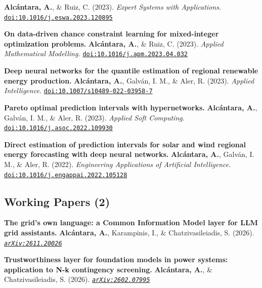 \documentclass[10pt,a4paper]{article}
\begin{document}
\begin{enumerate}[label={[\arabic*]}, series=publist, leftmargin=2.1em,
                  itemsep=5pt, topsep=3pt, parsep=0pt]
      \textbf{Alc\'antara, A.}, \& Ruiz, C. (2023). \textit{Expert Systems with Applications.} \href{https://doi.org/10.1016/j.eswa.2023.120895}{\nolinkurl{doi:10.1016/j.eswa.2023.120895}}\item \textbf{On data-driven chance constraint learning for mixed-integer optimization problems.}\newline
      \textbf{Alc\'antara, A.}, \& Ruiz, C. (2023). \textit{Applied Mathematical Modelling.} \href{https://doi.org/10.1016/j.apm.2023.04.032}{\nolinkurl{doi:10.1016/j.apm.2023.04.032}}\item \textbf{Deep neural networks for the quantile estimation of regional renewable energy production.}\newline
      \textbf{Alc\'antara, A.}, Galv\'an, I. M., \& Aler, R. (2023). \textit{Applied Intelligence.} \href{https://doi.org/10.1007/s10489-022-03958-7}{\nolinkurl{doi:10.1007/s10489-022-03958-7}}\item \textbf{Pareto optimal prediction intervals with hypernetworks.}\newline
      \textbf{Alc\'antara, A.}, Galv\'an, I. M., \& Aler, R. (2023). \textit{Applied Soft Computing.} \href{https://doi.org/10.1016/j.asoc.2022.109930}{\nolinkurl{doi:10.1016/j.asoc.2022.109930}}\item \textbf{Direct estimation of prediction intervals for solar and wind regional energy forecasting with deep neural networks.}\newline
      \textbf{Alc\'antara, A.}, Galv\'an, I. M., \& Aler, R. (2022). \textit{Engineering Applications of Artificial Intelligence.} \href{https://doi.org/10.1016/j.engappai.2022.105128}{\nolinkurl{doi:10.1016/j.engappai.2022.105128}}
\end{enumerate}

\subsection*{Working Papers (2)}
\begin{enumerate}[label={[\arabic*]}, resume=publist, leftmargin=2.1em,
                  itemsep=5pt, topsep=3pt, parsep=0pt]
\item \textbf{The grid's own language: a Common Information Model layer for LLM grid
      assistants.}\newline
      \textbf{Alc\'antara, A.}, Karampinis, I., \& Chatzivasileiadis, S. (2026).
      \href{https://arxiv.org/abs/2611.20026}{\textit{\nolinkurl{arXiv:2611.20026}}}
\item \textbf{Trustworthiness layer for foundation models in power systems: application to
      N-k contingency screening.}\newline
      \textbf{Alc\'antara, A.}, \& Chatzivasileiadis, S. (2026).
      \href{https://arxiv.org/abs/2602.07995}{\textit{\nolinkurl{arXiv:2602.07995}}}
\end{enumerate}
\end{document}
